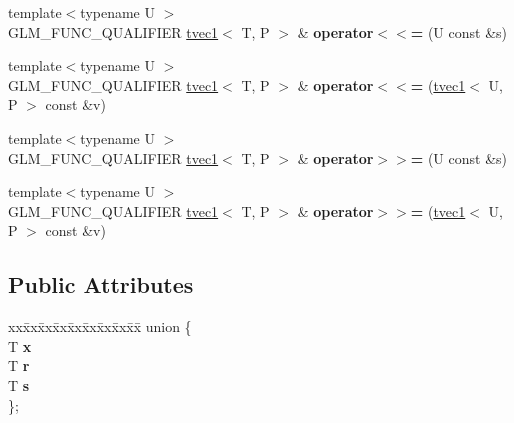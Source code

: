 \begin{DoxyCompactItemize}
\item 
{\footnotesize template$<$typename U $>$ }\\G\+L\+M\+\_\+\+F\+U\+N\+C\+\_\+\+Q\+U\+A\+L\+I\+F\+I\+ER \hyperlink{structglm_1_1detail_1_1tvec1}{tvec1}$<$ T, P $>$ \& {\bfseries operator$<$$<$=} (U const \&s)\hypertarget{structglm_1_1detail_1_1tvec1_a7ff4b3a808e1ef7000ad8d41d7a428bb}{}\label{structglm_1_1detail_1_1tvec1_a7ff4b3a808e1ef7000ad8d41d7a428bb}

\item 
{\footnotesize template$<$typename U $>$ }\\G\+L\+M\+\_\+\+F\+U\+N\+C\+\_\+\+Q\+U\+A\+L\+I\+F\+I\+ER \hyperlink{structglm_1_1detail_1_1tvec1}{tvec1}$<$ T, P $>$ \& {\bfseries operator$<$$<$=} (\hyperlink{structglm_1_1detail_1_1tvec1}{tvec1}$<$ U, P $>$ const \&v)\hypertarget{structglm_1_1detail_1_1tvec1_a61fb7165bc6cf2c741e7aea9af680e60}{}\label{structglm_1_1detail_1_1tvec1_a61fb7165bc6cf2c741e7aea9af680e60}

\item 
{\footnotesize template$<$typename U $>$ }\\G\+L\+M\+\_\+\+F\+U\+N\+C\+\_\+\+Q\+U\+A\+L\+I\+F\+I\+ER \hyperlink{structglm_1_1detail_1_1tvec1}{tvec1}$<$ T, P $>$ \& {\bfseries operator$>$$>$=} (U const \&s)\hypertarget{structglm_1_1detail_1_1tvec1_a9f9d23540183bc4baa3b01052f61e0f9}{}\label{structglm_1_1detail_1_1tvec1_a9f9d23540183bc4baa3b01052f61e0f9}

\item 
{\footnotesize template$<$typename U $>$ }\\G\+L\+M\+\_\+\+F\+U\+N\+C\+\_\+\+Q\+U\+A\+L\+I\+F\+I\+ER \hyperlink{structglm_1_1detail_1_1tvec1}{tvec1}$<$ T, P $>$ \& {\bfseries operator$>$$>$=} (\hyperlink{structglm_1_1detail_1_1tvec1}{tvec1}$<$ U, P $>$ const \&v)\hypertarget{structglm_1_1detail_1_1tvec1_a6867d5e71d657b7d5498979ab8d8f1cf}{}\label{structglm_1_1detail_1_1tvec1_a6867d5e71d657b7d5498979ab8d8f1cf}

\end{DoxyCompactItemize}
\subsection*{Public Attributes}
\begin{DoxyCompactItemize}
\item 
\begin{tabbing}
xx\=xx\=xx\=xx\=xx\=xx\=xx\=xx\=xx\=\kill
union \{\\
\>T {\bfseries x}\\
\>T {\bfseries r}\\
\>T {\bfseries s}\\
\}; \hypertarget{structglm_1_1detail_1_1tvec1_af7042164c9b7cde8baa31ce17afa0190}{}\label{structglm_1_1detail_1_1tvec1_af7042164c9b7cde8baa31ce17afa0190}
\\

\end{tabbing}\end{DoxyCompactItemize}


